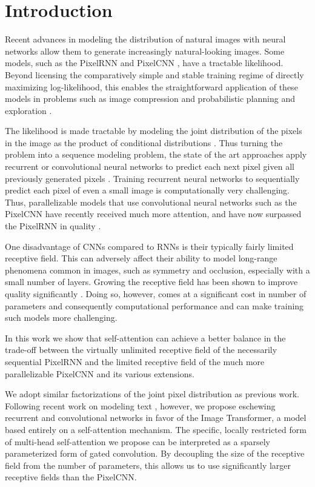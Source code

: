 \documentclass{article}
\begin{document}
 \section{Introduction}
Recent advances in modeling the distribution of natural images with neural networks allow them to generate increasingly natural-looking images. Some models, such as the PixelRNN and PixelCNN \cite{PixelRNN}, have a tractable likelihood. Beyond licensing the comparatively simple and stable training regime of directly maximizing log-likelihood, this enables the straightforward application of these models in problems such as image compression \cite{vandenoord14} and probabilistic planning and exploration \cite{Bellemarre16}.

The likelihood is made tractable by modeling the joint distribution of the pixels in the image as the product of conditional distributions \cite{larochelle2011, Theis2015}. Thus turning the problem into a sequence modeling problem, the state of the art approaches apply recurrent or convolutional neural networks to predict each next pixel given all previously generated pixels \cite{PixelRNN}. Training recurrent neural networks to sequentially predict each pixel of even a small image is computationally very challenging. Thus, parallelizable models that use convolutional neural networks such as the PixelCNN have recently received much more attention, and have now surpassed the PixelRNN in quality \cite{PixelCNN}.

One disadvantage of CNNs compared to RNNs is their typically fairly limited receptive field. This can adversely affect their ability to model long-range phenomena common in images, such as symmetry and occlusion, especially with a small number of layers. Growing the receptive field has been shown to improve quality significantly \cite{PixelCNNpp}. Doing so, however, comes at a significant cost in number of parameters and consequently computational performance and can make training such models more challenging.

In this work we show that self-attention \cite{cheng2016long, decomposableAttnModel, aiayn} can achieve a better balance in the trade-off between the virtually unlimited receptive field of the necessarily sequential PixelRNN and the limited receptive field of the much more parallelizable PixelCNN and its various extensions.


We adopt similar factorizations of the joint pixel distribution as previous work. Following recent work on modeling text \cite{aiayn}, however, we propose eschewing recurrent and convolutional networks in favor of the Image Transformer, a model based entirely on a self-attention mechanism. The specific, locally restricted form of multi-head self-attention we propose can be interpreted as a sparsely parameterized form of gated convolution. By decoupling the size of the receptive field from the number of parameters, this allows us to use significantly larger receptive fields than the PixelCNN.
\end{document}
